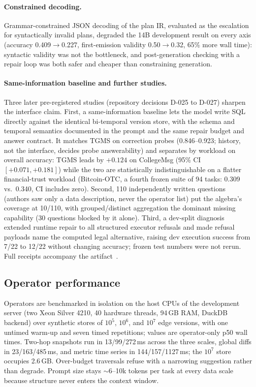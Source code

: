 \documentclass[11pt]{article}
\begin{document}
\paragraph{Constrained decoding.}
Grammar-constrained JSON decoding of the plan IR, evaluated as the
escalation for syntactically invalid plans, degraded the 14B
development result on every axis (accuracy 0.409$\to$0.227,
first-emission validity 0.50$\to$0.32, 65\% more wall time): syntactic
validity was not the bottleneck, and post-generation checking with a
repair loop was both safer and cheaper than constraining generation.

\paragraph{Same-information baseline and further studies.}
Three later pre-registered studies (repository decisions D-025 to
D-027) sharpen the interface claim. First, a same-information baseline
lets the model write SQL directly against the identical bi-temporal
version store, with the schema and temporal semantics documented in
the prompt and the same repair budget and answer contract. It matches
TGMS on correction probes (0.846--0.923; history, not the interface,
decides probe answerability) and separates by workload on overall
accuracy: TGMS leads by $+0.124$ on CollegeMsg (95\% CI
$[+0.071,+0.181]$) while the two are statistically indistinguishable
on a flatter financial-trust workload (Bitcoin-OTC, a fourth frozen
suite of 94 tasks: 0.309 vs.\ 0.340, CI includes zero). Second, 110
independently written questions (authors saw only a data description,
never the operator list) put the algebra's coverage at 10/110, with
grouped/distinct aggregation the dominant missing capability (30
questions blocked by it alone). Third, a dev-split diagnosis extended
runtime repair to all structured executor refusals and made refusal
payloads name the computed legal alternative, raising dev execution
success from 7/22 to 12/22 without changing accuracy; frozen test
numbers were not rerun. Full receipts accompany the
artifact~\cite{tgms2026}.

\subsection{Operator performance}
\label{sec:opperf}
Operators are benchmarked in isolation on the host CPUs of the
development server (two Xeon Silver 4210, 40 hardware threads, 94\,GB
RAM, DuckDB backend) over synthetic stores of $10^5$, $10^6$, and
$10^7$ edge versions, with one untimed warm-up and seven timed
repetitions; values are operator-only p50 wall times. Two-hop
snapshots run in 13/99/272\,ms across the three scales, global diffs
in 23/163/485\,ms, and metric time series in 144/157/1127\,ms; the
$10^7$ store occupies 2.6\,GB. Over-budget traversals refuse with a
narrowing suggestion rather than degrade. Prompt size stays
${\sim}$6--10k tokens per task at every data scale because structure
never enters the context window.
\end{document}
